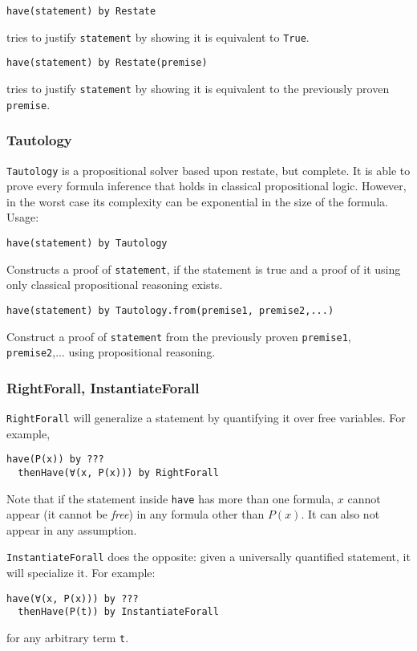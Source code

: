 \begin{lstlisting}[language=lisa]
  have(statement) by Restate
\end{lstlisting}
tries to justify \lstinline|statement| by showing it is equivalent to \lstinline|True|.

\begin{lstlisting}[language=lisa]
  have(statement) by Restate(premise)
\end{lstlisting}
tries to justify \lstinline|statement| by showing it is equivalent to the previously proven \lstinline|premise|.

\subsubsection*{Tautology}
\lstinline|Tautology| is a propositional solver based upon restate, but complete. It is able to prove every formula inference that holds in classical propositional logic. However, in the worst case its complexity can be exponential in the size of the formula. Usage:

\begin{lstlisting}[language=lisa]
  have(statement) by Tautology
\end{lstlisting}
Constructs a proof of \lstinline|statement|, if the statement is true and a proof of it using only classical propositional reasoning exists.

\begin{lstlisting}[language=lisa]
  have(statement) by Tautology.from(premise1, premise2,...)
\end{lstlisting}
Construct a proof of \lstinline|statement| from the previously proven \lstinline|premise1|, \lstinline|premise2|,... using propositional reasoning.


\subsubsection*{RightForall, InstantiateForall}
\lstinline|RightForall| will generalize a statement by quantifying it over free variables. For example,
\begin{lstlisting}[language=lisa]
  have(P(x)) by ???
  thenHave(∀(x, P(x))) by RightForall 
\end{lstlisting}
Note that if the statement inside \lstinline|have| has more than one formula, $x$ cannot appear (it cannot be \emph{free}) in any formula other than $P(x)$. It can also not appear in any assumption.

\lstinline|InstantiateForall| does the opposite: given a universally quantified statement, it will specialize it. For example:
\begin{lstlisting}[language=lisa]
  have(∀(x, P(x))) by ???
  thenHave(P(t)) by InstantiateForall 
\end{lstlisting}
for any arbitrary term \lstinline|t|.

